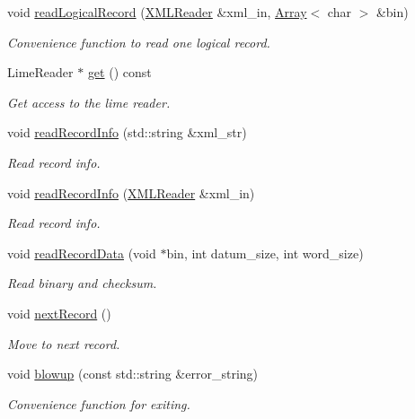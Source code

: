 \begin{DoxyCompactItemize}
void \mbox{\hyperlink{classADATIO_1_1ADATFileReader_ga7d36d6dd7fef90986d0c435ddaa86eae}{read\+Logical\+Record}} (\mbox{\hyperlink{classADATXML_1_1XMLReader}{X\+M\+L\+Reader}} \&xml\+\_\+in, \mbox{\hyperlink{classXMLArray_1_1Array}{Array}}$<$ char $>$ \&bin)
\begin{DoxyCompactList}\small\item\em Convenience function to read one logical record. \end{DoxyCompactList}\item 
Lime\+Reader $\ast$ \mbox{\hyperlink{classADATIO_1_1ADATFileReader_ga40c1ee10fe351724bdfc91f4fd655328}{get}} () const
\begin{DoxyCompactList}\small\item\em Get access to the lime reader. \end{DoxyCompactList}\item 
void \mbox{\hyperlink{classADATIO_1_1ADATFileReader_gade5b9d659e34ec9c9de267858a675d7d}{read\+Record\+Info}} (std\+::string \&xml\+\_\+str)
\begin{DoxyCompactList}\small\item\em Read record info. \end{DoxyCompactList}\item 
void \mbox{\hyperlink{classADATIO_1_1ADATFileReader_ga4d771a46d7db77cd0ae5999113733795}{read\+Record\+Info}} (\mbox{\hyperlink{classADATXML_1_1XMLReader}{X\+M\+L\+Reader}} \&xml\+\_\+in)
\begin{DoxyCompactList}\small\item\em Read record info. \end{DoxyCompactList}\item 
void \mbox{\hyperlink{classADATIO_1_1ADATFileReader_ga525c9902a7ee7ebe41c688897da0652e}{read\+Record\+Data}} (void $\ast$bin, int datum\+\_\+size, int word\+\_\+size)
\begin{DoxyCompactList}\small\item\em Read binary and checksum. \end{DoxyCompactList}\item 
void \mbox{\hyperlink{classADATIO_1_1ADATFileReader_ga032651053fa6b2de6d3977f15862c48e}{next\+Record}} ()
\begin{DoxyCompactList}\small\item\em Move to next record. \end{DoxyCompactList}\item 
void \mbox{\hyperlink{classADATIO_1_1ADATFileReader_gaddf83cb612ce869fe7a0a5f7e559fe72}{blowup}} (const std\+::string \&error\+\_\+string)
\begin{DoxyCompactList}\small\item\em Convenience function for exiting. \end{DoxyCompactList}\end{DoxyCompactItemize}


